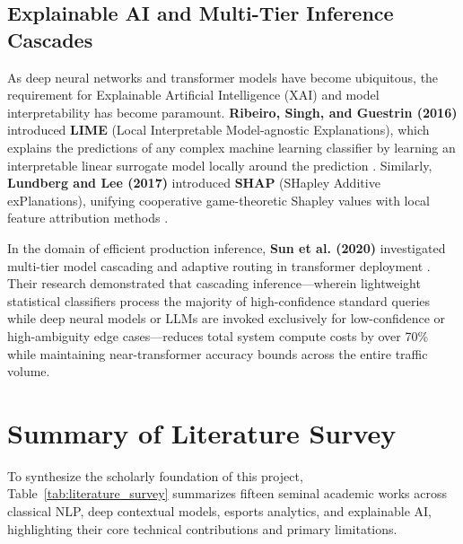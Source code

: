 \subsection{Explainable AI and Multi-Tier Inference Cascades}

As deep neural networks and transformer models have become ubiquitous, the requirement for Explainable Artificial Intelligence (XAI) and model interpretability has become paramount. \textbf{Ribeiro, Singh, and Guestrin (2016)} introduced \textbf{LIME} (Local Interpretable Model-agnostic Explanations), which explains the predictions of any complex machine learning classifier by learning an interpretable linear surrogate model locally around the prediction \cite{ribeiro2016why}. Similarly, \textbf{Lundberg and Lee (2017)} introduced \textbf{SHAP} (SHapley Additive exPlanations), unifying cooperative game-theoretic Shapley values with local feature attribution methods \cite{lundberg2017unified}. 

In the domain of efficient production inference, \textbf{Sun et al. (2020)} investigated multi-tier model cascading and adaptive routing in transformer deployment \cite{sun2020mobilebert}. Their research demonstrated that cascading inference—wherein lightweight statistical classifiers process the majority of high-confidence standard queries while deep neural models or LLMs are invoked exclusively for low-confidence or high-ambiguity edge cases—reduces total system compute costs by over 70\% while maintaining near-transformer accuracy bounds across the entire traffic volume.

\section{Summary of Literature Survey}
\label{sec:lit_table}

To synthesize the scholarly foundation of this project, Table~\ref{tab:literature_survey} summarizes fifteen seminal academic works across classical NLP, deep contextual models, esports analytics, and explainable AI, highlighting their core technical contributions and primary limitations.

